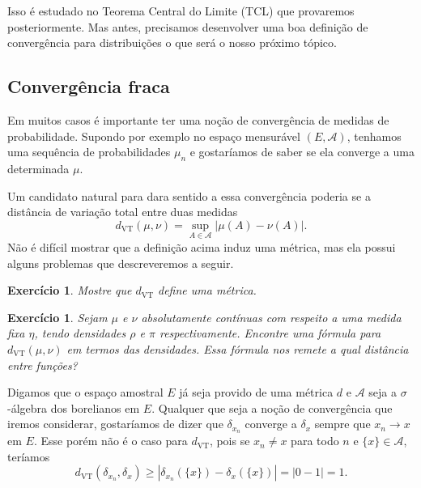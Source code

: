 \documentclass[reqno, draft]{book}
\newcommand*\1{\mathds{1}}
\newtheorem{exercise}[example]{Exercício}
\DeclareMathOperator{\VT}{VT}
\begin{document}
Isso é estudado no Teorema Central do Limite (TCL) que provaremos posteriormente.
Mas antes, precisamos desenvolver uma boa definição de convergência para distribuições o que será o nosso próximo tópico.


\subsection{Convergência fraca}

Em muitos casos é importante ter uma noção de convergência de medidas de probabilidade.
Supondo por exemplo no espaço mensurável $(E,\mathcal{A})$, tenhamos uma sequência de probabilidades $\mu_n$ e gostaríamos de saber se ela converge a uma determinada $\mu$.

Um candidato natural para dara sentido a essa convergência poderia se a distância de variação total entre duas medidas
\begin{equation}
  d_{\VT}(\mu,\nu) = \sup_{A \in \mathcal{A}} |\mu(A) - \nu(A)|.
\end{equation}
Não é difícil mostrar que a definição acima induz uma métrica, mas ela possui alguns problemas que descreveremos a seguir.

\begin{exercise}
  Mostre que $d_{\VT}$ define uma métrica.
\end{exercise}

\begin{exercise}
  Sejam $\mu$ e $\nu$ absolutamente contínuas com respeito a uma medida fixa $\eta$, tendo densidades $\rho$ e $\pi$ respectivamente.
  Encontre uma fórmula para $d_{\VT}(\mu, \nu)$ em termos das densidades.
  Essa fórmula nos remete a qual distância entre funções?
\end{exercise}

Digamos que o espaço amostral $E$ já seja provido de uma métrica $d$ e $\mathcal{A}$ seja a $\sigma$-álgebra dos borelianos em $E$.
Qualquer que seja a noção de convergência que iremos considerar, gostaríamos de dizer que $\delta_{x_n}$ converge a $\delta_x$ sempre que $x_n \to x$ em $E$.
Esse porém não é o caso para $d_{\VT}$, pois se $x_n \neq x$ para todo $n$ e $\{x\} \in \mathcal{A}$, teríamos
\begin{equation}
  d_{\VT}(\delta_{x_n}, \delta_x) \geq |\delta_{x_n}(\{x\}) - \delta_{x}(\{x\}) | = |0 - 1| = 1.
\end{equation}
\end{document}
